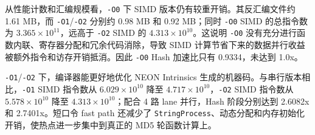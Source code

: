 \documentclass[UTF8,a4paper,12pt]{ctexart}
\begin{document}
从性能计数和汇编规模看，\texttt{-O0} 下 SIMD 版本仍有较重开销。其反汇编文件约 1.61 MB，而 \texttt{-O1}/\texttt{-O2} 分别约 0.98 MB 和 0.92 MB；同时 \texttt{-O0} SIMD 的总指令数为 $3.365\times 10^{11}$，远高于 \texttt{-O2} SIMD 的 $4.313\times 10^{10}$。这说明 \texttt{-O0} 没有充分进行函数内联、寄存器分配和冗余代码消除，导致 SIMD 计算节省下来的数据并行收益被额外指令和访存开销抵消。因此 \texttt{-O0} Hash 加速比只有 0.9334，未达到 1.0x。

\texttt{-O1}/\texttt{-O2} 下，编译器能更好地优化 NEON Intrinsics 生成的机器码。与串行版本相比，\texttt{-O1} SIMD 指令数从 $6.029\times 10^{10}$ 降至 $4.717\times 10^{10}$，\texttt{-O2} SIMD 指令数从 $5.578\times 10^{10}$ 降至 $4.313\times 10^{10}$；配合 4 路 lane 并行，Hash 阶段分别达到 2.6082x 和 2.7401x。短口令 fast path 还减少了 \texttt{StringProcess}、动态分配和内存初始化开销，使热点进一步集中到真正的 MD5 轮函数计算上。
\end{document}
